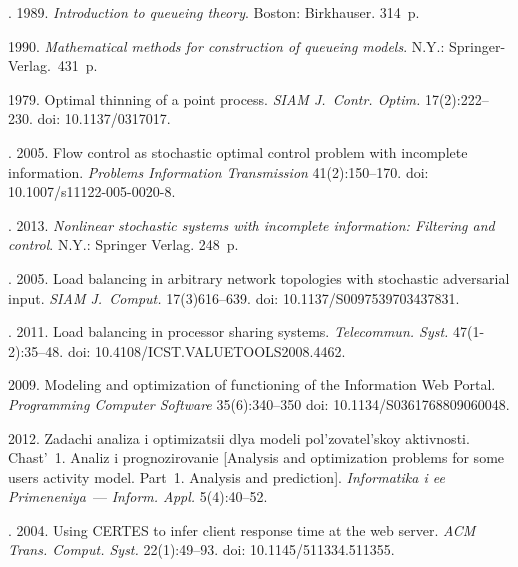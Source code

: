   \begin{multicols}{2}

\renewcommand{\bibname}{\protect\rmfamily References}

{\small\frenchspacing
 {%
 \begin{thebibliography}{99}
. 1989.
\textit{Introduction to queueing theory}. Boston: Birkhauser. 314~p.

1990. \textit{Mathematical methods for construction of queueing models}.
N.Y.: Springer-Verlag.~431~p.

 1979. Optimal thinning of a point process.
\textit{SIAM J.~Contr. Optim.} 17(2):222--230. doi: 10.1137/0317017.

.
2005. Flow control as stochastic optimal control problem with incomplete
information. \textit{Problems Information Transmission}
41(2):150--170. doi: 10.1007/s11122-005-0020-8.

. 2013.
\textit{Nonlinear stochastic systems with incomplete information: Filtering and
control}. N.Y.: Springer Verlag. 248~p.

. 2005.
Load balancing in arbitrary network topologies
with stochastic adversarial input. \textit{SIAM J.~Comput.}
17(3)616--639. doi: 10.1137/S0097539703437831.

. 2011.
Load balancing in processor sharing systems. \textit{Telecommun. Syst.}
47(1-2):35--48. doi: 10.4108/ICST.VALUETOOLS2008.4462.

 2009. Modeling and
optimization of functioning of the Information Web Portal.
\textit{Programming Computer Software} 35(6):340--350
doi: 10.1134/S0361768809060048.

 2012. Zadachi analiza i optimizatsii dlya modeli
pol'zovatel'skoy aktivnosti. Chast'~1. Analiz i prognozirovanie
[Analysis and optimization problems
for some users activity model. Part~1. Analysis and prediction].
\textit{Informatika i ee Primeneniya}~--- \textit{Inform.
Appl.} 5(4):40--52.

. 2004.
Using CERTES to infer client response time at the web server.
\textit{ACM Trans. Comput. Syst.} 22(1):49--93.
doi: 10.1145/511334.511355.


\end{thebibliography}}}
\end{multicols}
